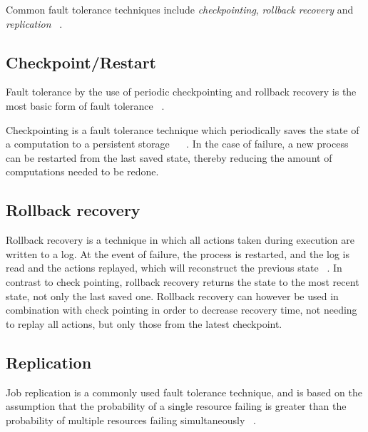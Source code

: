 \documentclass{cslthse-msc}
\begin{document}
Common fault tolerance techniques include \emph{checkpointing}, \emph{rollback recovery} and \emph{replication} ~\cite{relGridSystems}.

\subsection{Checkpoint/Restart} \label{subsec:background_checkpoint}
Fault tolerance by the use of periodic checkpointing and rollback recovery is the most basic form of fault tolerance ~\cite{surveyFaultParallel}.

Checkpointing is a fault tolerance technique which periodically saves the state of a computation to a persistent storage ~\cite{relGridSystems} ~\cite{surveyFaultParallel}. In the case of failure, a new process can be restarted from the last saved state, thereby reducing the amount of computations needed to be redone.


\subsection{Rollback recovery} \label{subsec:background_rollback}
Rollback recovery is a technique in which all actions taken during execution are written to a log. At the event of failure, the process is restarted, and the log is read and the actions replayed, which will reconstruct the previous state ~\cite{surveyFaultParallel}. In contrast to check pointing, rollback recovery returns the state to the most recent state, not only the last saved one. Rollback recovery can however be used in combination with check pointing in order to decrease recovery time, not needing to replay all actions, but only those from the latest checkpoint.

\subsection{Replication} \label{subsec:background_replication}
Job replication is a commonly used fault tolerance technique, and is based on the assumption that the probability of a single resource failing is greater than the probability of multiple resources failing simultaneously ~\cite{faultToleranceGrid}.
\end{document}
